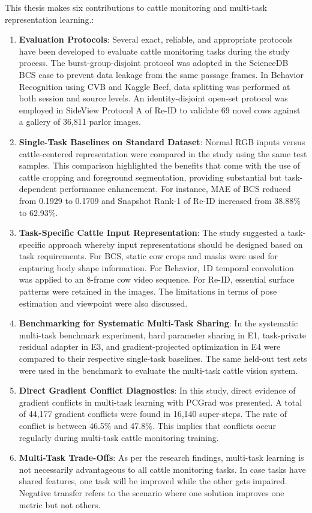 This thesis makes six contributions to cattle monitoring and multi-task representation learning.:
\begin{enumerate}
    \item \textbf{Evaluation Protocols}: Several exact, reliable, and appropriate protocols have been developed to evaluate cattle monitoring tasks during the study process. The burst-group-disjoint protocol was adopted in the ScienceDB BCS case to prevent data leakage from the same passage frames. In Behavior Recognition using CVB and Kaggle Beef, data splitting was performed at both session and source levels. An identity-disjoint open-set protocol was employed in SideView Protocol A of Re-ID to validate 69 novel cows against a gallery of 36,811 parlor images.
    \item \textbf{Single-Task Baselines on Standard Dataset}: Normal RGB inputs versus cattle-centered representation were compared in the study using the same test samples. This comparison highlighted the benefits that come with the use of cattle cropping and foreground segmentation, providing substantial but task-dependent performance enhancement. For instance, MAE of BCS reduced from 0.1929 to 0.1709 and Snapshot Rank-1 of Re-ID increased from 38.88\% to 62.93\%.
    \item \textbf{Task-Specific Cattle Input Representation}: The study suggested a task-specific approach whereby input representations should be designed based on task requirements. For BCS, static cow crops and masks were used for capturing body shape information. For Behavior, 1D temporal convolution was applied to an 8-frame cow video sequence. For Re-ID, essential surface patterns were retained in the images. The limitations in terms of pose estimation and viewpoint were also discussed.
    \item \textbf{Benchmarking for Systematic Multi-Task Sharing}: In the systematic multi-task benchmark experiment, hard parameter sharing in E1, task-private residual adapter in E3, and gradient-projected optimization in E4 were compared to their respective single-task baselines. The same held-out test sets were used in the benchmark to evaluate the multi-task cattle vision system.
    \item \textbf{Direct Gradient Conflict Diagnostics}: In this study, direct evidence of gradient conflicts in multi-task learning with PCGrad was presented. A total of 44,177 gradient conflicts were found in 16,140 super-steps. The rate of conflict is between 46.5\% and 47.8\%. This implies that conflicts occur regularly during multi-task cattle monitoring training.
    \item \textbf{Multi-Task Trade-Offs}: As per the research findings, multi-task learning is not necessarily advantageous to all cattle monitoring tasks. In case tasks have shared features, one task will be improved while the other gets impaired. Negative transfer refers to the scenario where one solution improves one metric but not others.
\end{enumerate}

